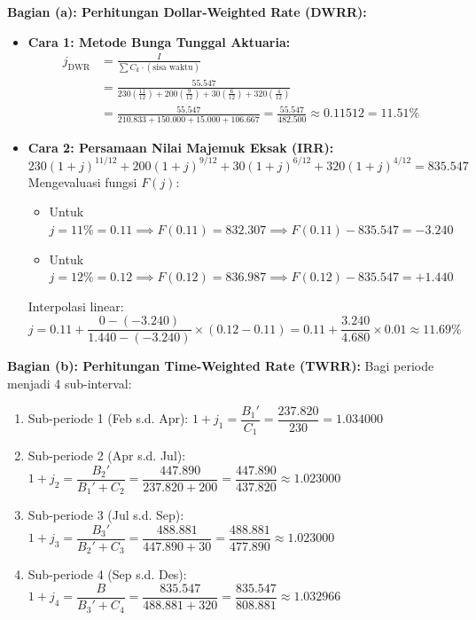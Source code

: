 \documentclass[11pt,a4paper]{article}
\begin{document}
\begin{examplebox}
\textbf{Bagian (a): Perhitungan Dollar-Weighted Rate (DWRR):}
\begin{itemize}
    \item \textbf{Cara 1: Metode Bunga Tunggal Aktuaria:}
    \begin{align*}
        j_{\text{DWR}} &= \frac{I}{\sum C_k \cdot (\text{sisa waktu})} \\[0.4em]
                       &= \frac{55.547}{230 \left(\frac{11}{12}\right) + 200 \left(\frac{9}{12}\right) + 30 \left(\frac{6}{12}\right) + 320 \left(\frac{4}{12}\right)} \\[0.4em]
                       &= \frac{55.547}{210.833 + 150.000 + 15.000 + 106.667} = \frac{55.547}{482.500} \approx 0.11512 = 11.51\%
    \end{align*}
    
    \item \textbf{Cara 2: Persamaan Nilai Majemuk Eksak (IRR):}
    \begin{equation*}
        230 (1 + j)^{11/12} + 200 (1 + j)^{9/12} + 30 (1 + j)^{6/12} + 320 (1 + j)^{4/12} = 835.547
    \end{equation*}
    Mengevaluasi fungsi $F(j)$:
    \begin{itemize}
        \item Untuk $j = 11\% = 0.11 \implies F(0.11) = 832.307 \implies F(0.11) - 835.547 = -3.240$
        \item Untuk $j = 12\% = 0.12 \implies F(0.12) = 836.987 \implies F(0.12) - 835.547 = +1.440$
    \end{itemize}
    Interpolasi linear:
    \begin{equation*}
        j = 0.11 + \frac{0 - (-3.240)}{1.440 - (-3.240)} \times (0.12 - 0.11) = 0.11 + \frac{3.240}{4.680} \times 0.01 \approx 11.69\%
    \end{equation*}
\end{itemize}

\textbf{Bagian (b): Perhitungan Time-Weighted Rate (TWRR):}
Bagi periode menjadi 4 sub-interval:
\begin{enumerate}[label=\arabic*.]
    \item Sub-periode 1 (Feb s.d. Apr): $1 + j_1 = \dfrac{B_1'}{C_1} = \dfrac{237.820}{230} = 1.034000$
    \item Sub-periode 2 (Apr s.d. Jul): $1 + j_2 = \dfrac{B_2'}{B_1' + C_2} = \dfrac{447.890}{237.820 + 200} = \dfrac{447.890}{437.820} \approx 1.023000$
    \item Sub-periode 3 (Jul s.d. Sep): $1 + j_3 = \dfrac{B_3'}{B_2' + C_3} = \dfrac{488.881}{447.890 + 30} = \dfrac{488.881}{477.890} \approx 1.023000$
    \item Sub-periode 4 (Sep s.d. Des): $1 + j_4 = \dfrac{B}{B_3' + C_4} = \dfrac{835.547}{488.881 + 320} = \dfrac{835.547}{808.881} \approx 1.032966$
\end{enumerate}


\end{examplebox}
\end{document}
